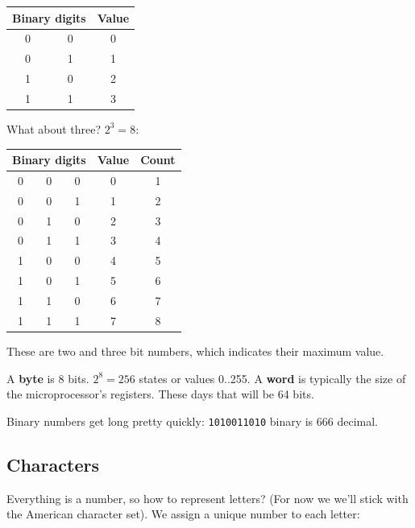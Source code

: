 \documentclass[titlepage]{tufte-book}
\begin{document}
\begin{fullwidth}
\begin{center}
\begin{tabular}{|cc|c|}
\hline
\multicolumn{2}{|c|}{Binary digits} & Value\\
\hline
0 & 0 & 0\\
0 & 1 & 1\\
1 & 0 & 2\\
1 & 1 & 3\\
\hline
\end{tabular}
\end{center}

What about three? $2^3 = 8$:

\begin{center}
\begin{tabular}{|ccc|c|c|}
\hline
\multicolumn{3}{|c|}{Binary digits} & Value & Count \\
\hline
0 & 0 & 0 & 0 & 1\\
0 & 0 & 1 & 1 & 2\\
0 & 1 & 0 & 2 & 3\\
0 & 1 & 1 & 3 & 4\\
1 & 0 & 0 & 4 & 5\\
1 & 0 & 1 & 5 & 6\\
1 & 1 & 0 & 6 & 7\\
1 & 1 & 1 & 7 & 8\\
\hline
\end{tabular}
\end{center}

These are two and three bit numbers, which indicates their maximum value.

A {\bf byte} is 8 bits. $2^8 = 256$ states or values 0..255.  A {\bf word} is typically the size of the microprocessor's registers. These days that will be 64 bits.

Binary numbers get long pretty quickly: {\tt 1010011010} binary is 666 decimal.

\subsection{Characters}

Everything is a number, so how to represent letters? (For now we we'll stick with the American character set). We assign a unique number to each letter:


\end{fullwidth}
\end{document}
